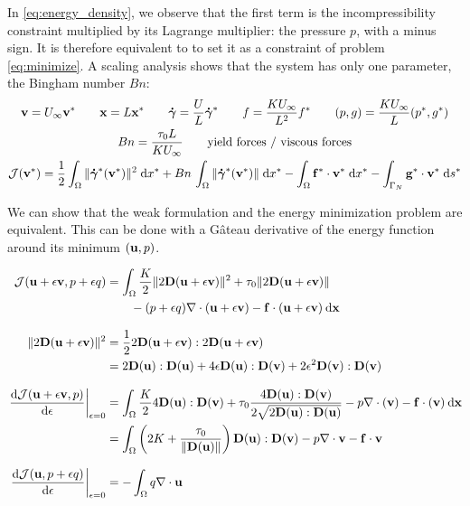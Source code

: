 \documentclass[11 pt]{report}
\begin{document}
In \cref{eq:energy_density}, we observe that the first term is the incompressibility constraint multiplied by its Lagrange multiplier: the pressure $p$, with a minus sign. It is therefore equivalent to to set it as a constraint of problem \eqref{eq:minimize}. A scaling analysis shows that the system has only one parameter, the Bingham number $Bn$:
    \begin{gather}
        \mathbf{v} = U_{\infty}\mathbf{v}^* \qquad \mathbf{x} = L \mathbf{x}^* \qquad \boldsymbol{\dot \gamma} = \frac{U}{L} \boldsymbol{\dot \gamma}^* \qquad f = \frac{K U_{\infty}}{L^2}f^* \qquad (p,g) = \frac{K U_{\infty}}{L}(p^*,g^*)\\
        Bn = \frac{\tau_0 L}{K U_{\infty}} \qquad \text{yield forces / viscous forces}\\
        \mathcal{J}(\mathbf{v}^*) = \frac{1}{2}\int_{\Omega} \|\boldsymbol{\dot \gamma}^*(\mathbf{v}^*)\|^2 \;\dd x^* + Bn \, \int_{\Omega} \|\boldsymbol{\dot \gamma}^*(\mathbf{v}^*)\| \;\dd x^* - \int_{\Omega} \mathbf{f}^*\cdot \mathbf{v}^* \; \dd x^* - \int_{\Gamma_N} \mathbf{g^*} \cdot \mathbf{v}^* \;\dd s^*
    \end{gather}

We can show that the weak formulation and the energy minimization problem are equivalent. This can be done with a Gâteau derivative of the energy function around its minimum $(\mathbf{u}, p)$.

\begin{align}
    \mathcal{J}(\mathbf{u} + \epsilon \mathbf{v}, p+\epsilon q) &= \int_{\Omega} \frac{K}{2} \|2\mathbf{D}(\mathbf{u} + \epsilon \mathbf{v})\|^2 + \tau_0  \|2\mathbf{D}(\mathbf{u} + \epsilon \mathbf{v})\| \\
    &\qquad - (p + \epsilon q) \nabla \cdot (\mathbf{u} + \epsilon \mathbf{v}) - \mathbf{f}\cdot(\mathbf{u} + \epsilon \mathbf{v}) \: \dd \mathbf{x}\\[8pt]
    \|2\mathbf{D}(\mathbf{u} + \epsilon \mathbf{v})\|^2 &= \frac{1}{2} 2\mathbf{D}(\mathbf{u} + \epsilon \mathbf{v}) : 2\mathbf{D}(\mathbf{u} + \epsilon \mathbf{v}) \nonumber \\
    &= 2 \mathbf{D}(\mathbf{u}):\mathbf{D}(\mathbf{u}) + 4\epsilon \mathbf{D}(\mathbf{u}):\mathbf{D}(\mathbf{v}) + 2\epsilon^2 \mathbf{D}(\mathbf{v}):\mathbf{D}(\mathbf{v})\\[8pt]
    \left. \dv{\mathcal{J}(\mathbf{u}+ \epsilon \mathbf{v}, p)}{\epsilon}\right\vert_{\epsilon=0} &= \int_{\Omega} \frac{K}{2}   4\mathbf{D}(\mathbf{u}):\mathbf{D}(\mathbf{v}) + \tau_0 \frac{4\mathbf{D}(\mathbf{u}):\mathbf{D}(\mathbf{v})}{2\sqrt{2\mathbf{D}(\mathbf{u}):\mathbf{D}(\mathbf{u})}} - p\nabla\cdot(\mathbf{v}) - \mathbf{f}\cdot(\mathbf{v}) \: \dd \mathbf{x}\nonumber\\
    &= \int_{\Omega} \left(2K + \frac{\tau_0}{\|\mathbf{D}(\mathbf{u})\|}\right) \mathbf{D}(\mathbf{u}):\mathbf{D}(\mathbf{v}) - p\nabla\cdot \mathbf{v} - \mathbf{f} \cdot \mathbf{v} \label{eq:gateau_1} \\[8pt]
    \left. \dv{\mathcal{J}(\mathbf{u}, p+\epsilon q)}{\epsilon}\right\vert_{\epsilon=0} &= -\int_{\Omega}q \nabla \cdot \mathbf{u}  \label{eq:gateau_2}
\end{align}
\end{document}
